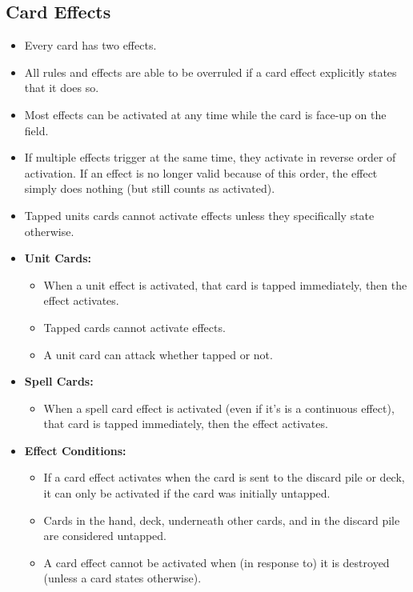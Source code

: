 \subsection{Card Effects\label{CardEffectsRuleSection}}
\begin{itemize}
    \item Every card has two effects.
    \item All rules and effects are able to be overruled if a card effect explicitly states that it does so.
    \item Most effects can be activated at any time while the card is face-up on the field.
    \item If multiple effects trigger at the same time, they activate in reverse order of activation. If an effect is no longer valid because of this order, the effect simply does nothing (but still counts as activated).
    \item Tapped units cards cannot activate effects unless they specifically state otherwise.
    \item \textbf{Unit Cards:}
    \begin{itemize}
        \item When a unit effect is activated, that card is tapped immediately, then the effect activates.
        \item Tapped cards cannot activate effects.
        \item A unit card can attack whether tapped or not.
    \end{itemize}
    \item \textbf{Spell Cards:}
    \begin{itemize}
        \item When a spell card effect is activated (even if it's is a continuous effect), that card is tapped immediately, then the effect activates.
    \end{itemize}
    \item \textbf{Effect Conditions:}
    \begin{itemize}
        \item If a card effect activates when the card is sent to the discard pile or deck, it can only be activated if the card was initially untapped.
        \item Cards in the hand, deck, underneath other cards, and in the discard pile are considered untapped.
        \item A card effect cannot be activated when (in response to) it is destroyed (unless a card states otherwise).
    \end{itemize}

\end{itemize}
